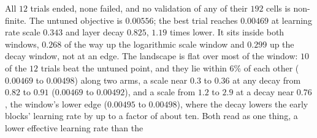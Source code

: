 \documentclass[11pt]{article}
\begin{document}
\begin{itemize}
    All $12$ trials ended, none failed, and no validation of any of their $192$ cells is non-finite. The untuned
    objective is $0.00556$; the best trial reaches $0.00469$ at learning rate scale $0.343$ and layer decay $0.825$,
    $1.19$ times lower. It sits inside both windows, $0.268$ of the way up the logarithmic scale window and $0.299$ up
    the decay window, not at an edge. The landscape is flat over most of the window: $10$ of the $12$ trials beat the
    untuned point, and they lie within $6\%$ of each other ($0.00469$ to $0.00498$) along two arms, a scale near
    $0.3$ to $0.36$ at any decay from $0.82$ to $0.91$ ($0.00469$ to $0.00492$), and a scale from $1.2$ to $2.9$ at a
    decay near $0.76$, the window's lower edge ($0.00495$ to $0.00498$), where the decay lowers the early blocks'
    learning rate by up to a factor of about ten. Both read as one thing, a lower effective learning rate than the

\end{itemize}
\end{document}
